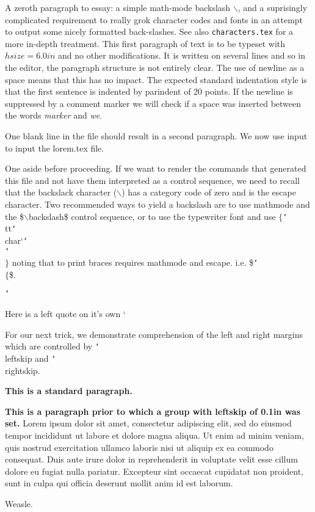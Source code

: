 
\hsize=6.0in

A zeroth paragraph to essay: a simple math-mode backslash $ \backslash $, 
and a suprisingly complicated requirement to really grok character codes
and fonts in an attempt to output some nicely formatted back-slashes.
See also {\tt characters.tex} for a more in-depth treatment.
\smallskip
This first paragraph of text is to be typeset with $hsize=6.0in$ and no other modifications.
It is written on
several
lines
and 
so
in the editor, the paragraph structure is not entirely clear.
The
use
of newline as a space means that this has no impact.
The expected standard indentation style is that the first sentence is indented by 
parindent of 20 points.
If the newline is suppressed by a comment marker%
we will check if a space was inserted between the words {\it marker} and {\it we}.

One blank line in the file should result in a second paragraph.
We now use input to input the lorem.tex file.


\def\bsm{$\backlash $}
\def\bst{{\tt\char`\\}}

One aside before proceeding. If we want to render the commands that generated this
file and not have them interpreted as a control sequence, we need to recall that the
backslack character ($\backslash $) has a category code of zero and is the escape 
character.  Two recommended ways to yield a backslash are to use mathmode and the
\$$\backslash$backslash\$ control sequence, or to use the typewriter font and
use $\{$\bst tt\bst char{`}\bst\bst$\}$ noting that to print braces requires
mathmode and escape. i.e. \$\bst$\{$\$.

\bst

Here is a left quote on it's own ` 

For our next trick, we demonstrate comprehension of the left and right margins
which are controlled by \bst{leftskip} and \bst{rightskip}.

{\bf This is a standard paragraph.}%


{\leftskip=-0.9in
{\bf This is a paragraph prior to which a group with leftskip of 0.1in was set.}%
Lorem ipsum dolor sit amet, consectetur adipiscing elit, sed do eiusmod tempor incididunt ut labore et dolore magna aliqua. Ut enim ad minim veniam, quis nostrud exercitation ullamco laboris nisi ut aliquip ex ea commodo consequat. Duis aute irure dolor in reprehenderit in voluptate velit esse cillum dolore eu fugiat nulla pariatur. Excepteur sint occaecat cupidatat non proident, sunt in culpa qui officia deserunt mollit anim id est laborum.
\par

\par

\par}



\par
Weasle.


\bye
